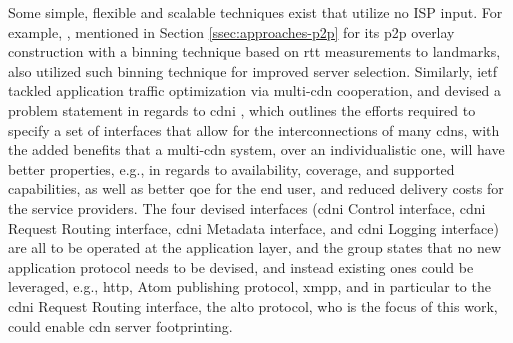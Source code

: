     Some simple, flexible and scalable techniques exist that utilize no ISP input.
    For example, \cite{topology-aware-p2p-server-selection}, mentioned in Section \ref{ssec:approaches-p2p} for its \gls{p2p} overlay construction with a binning technique based on \gls{rtt} measurements to landmarks, also utilized such binning technique for improved server selection.
    Similarly, \gls{ietf} tackled application traffic optimization via multi-\gls{cdn} cooperation, and devised a problem statement in regards to \gls{cdni} \cite{cdni-problem-statement}, which outlines the efforts required to specify a set of interfaces that allow for the interconnections of many \glspl{cdn}, with the added benefits that a multi-\gls{cdn} system, over an individualistic one, will have better properties, e.g., in regards to availability, coverage, and supported capabilities, as well as better \gls{qoe} for the end user, and reduced delivery costs for the service providers.
    The four devised interfaces (\gls{cdni} Control interface, \gls{cdni} Request Routing interface, \gls{cdni} Metadata interface, and \gls{cdni} Logging interface) are all to be operated at the application layer, and the group states that no new application protocol needs to be devised, and instead existing ones could be leveraged, e.g., \gls{http}, Atom publishing protocol, \gls{xmpp}, and in particular to the \gls{cdni} Request Routing interface, the \gls{alto} protocol, who is the focus of this work, could enable \gls{cdn} server footprinting.

